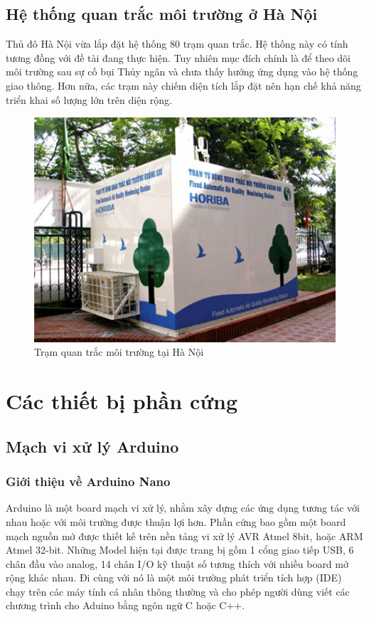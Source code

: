 \subsection{Hệ thống quan trắc môi trường ở Hà Nội}
Thủ đô Hà Nội vừa lắp đặt hệ thống 80 trạm quan trắc. Hệ thống này có tính tương đồng với đề tài đang thực hiện. Tuy nhiên mục đích chính là để theo dõi môi trường sau sự cố bụi Thủy ngân và chưa thấy hướng ứng dụng vào hệ thống giao thông. Hơn nữa, các trạm này chiếm diện tích lắp đặt nên hạn chế khả năng triển khai số lượng lớn trên diện rộng.
\begin{figure}[H] 
\centering    
\includegraphics[width=1.0\textwidth]{pic3}
\caption[Trạm quan trắc môi trường tại Hà Nội ]{Trạm quan trắc môi trường tại Hà Nội}
\label{fig:pic3}
\end{figure}

\section{Các thiết bị phần cứng}
\subsection{Mạch vi xử lý Arduino}
\subsubsection*{Giới thiệu về Arduino Nano}
Arduino là một board mạch vi xử lý, nhằm xây dựng các ứng dụng tương tác với nhau hoặc với môi trường được thuận lợi hơn. Phần cứng bao gồm một board mạch nguồn mở được thiết kế trên nền tảng vi xử lý AVR Atmel 8bit, hoặc ARM Atmel 32-bit. Những Model hiện tại được trang bị gồm 1 cổng giao tiếp USB, 6 chân đầu vào analog, 14 chân I/O kỹ thuật số tương thích với nhiều board mở rộng khác nhau. Đi cùng với nó là một môi trường phát triển tích hợp (IDE) chạy trên các máy tính cá nhân thông thường và cho phép người dùng viết các chương trình cho Aduino bằng ngôn ngữ C hoặc C++.

